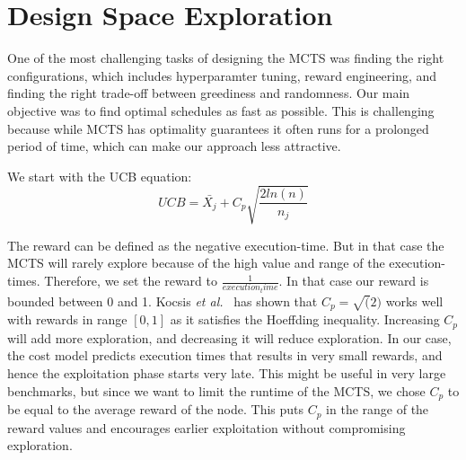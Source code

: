 \section{Design Space Exploration}
One of the most challenging tasks of designing the MCTS was finding the right configurations, which includes hyperparamter tuning, reward engineering, and finding the right trade-off between greediness and randomness. Our main objective was to find optimal schedules as fast as possible. This is challenging because while MCTS has optimality guarantees it often runs for a prolonged period of time, which can make our approach less attractive.

We start with the UCB equation:
\begin{equation}
    UCB = \bar{X_j} + C_p\sqrt{\frac{2ln(n)}{n_j}}
\end{equation}

The reward can be defined as the negative execution-time. But in that case the MCTS will rarely explore because of the high value and range of the execution-times. Therefore, we set the reward to $\frac{1}{execution_time}$. In that case our reward is bounded between 0 and 1. Kocsis \textit{et al.}~\cite{kocsis2006improved} has shown that $C_p = \sqrt(2)$ works well with rewards in range $[0,1]$ as it satisfies the Hoeffding inequality. Increasing $C_p$ will add more exploration, and decreasing it will reduce exploration. In our case, the cost model predicts execution times that results in very small rewards, and hence the exploitation phase starts very late. This might be useful in very large benchmarks, but since we want to limit the runtime of the MCTS, we chose $C_p$ to be equal to the average reward of the node. This puts $C_p$ in the range of the reward values and encourages earlier exploitation without compromising exploration.


